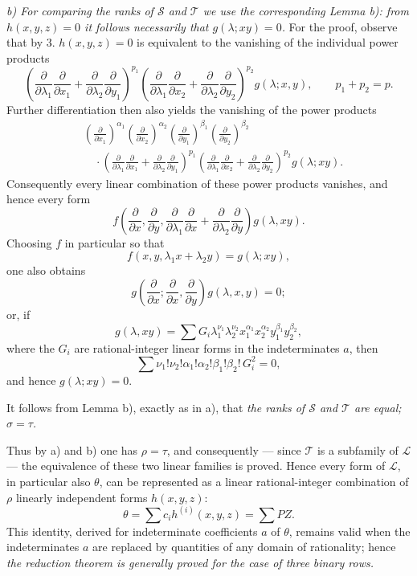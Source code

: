 \emph{b) For comparing the ranks of $\mathcal S$ and $\mathcal T$ we use the corresponding Lemma b): from $h(x,y,z)=0$ it follows necessarily that $g(\lambda;xy)=0$.} For the proof, observe that by 3. $h(x,y,z)=0$ is equivalent to the vanishing of the individual power products
\[
 \left(\frac{\partial}{\partial\lambda_1}\frac{\partial}{\partial x_1}
 +\frac{\partial}{\partial\lambda_2}\frac{\partial}{\partial y_1}\right)^{p_1}
 \left(\frac{\partial}{\partial\lambda_1}\frac{\partial}{\partial x_2}
 +\frac{\partial}{\partial\lambda_2}\frac{\partial}{\partial y_2}\right)^{p_2}g(\lambda;x,y),
 \qquad p_1+p_2=p.
\]
Further differentiation then also yields the vanishing of the power products
\[
\begin{aligned}
&\left(\frac{\partial}{\partial x_1}\right)^{\alpha_1}
 \left(\frac{\partial}{\partial x_2}\right)^{\alpha_2}
 \left(\frac{\partial}{\partial y_1}\right)^{\beta_1}
 \left(\frac{\partial}{\partial y_2}\right)^{\beta_2} \\
&\quad\cdot
 \left(\frac{\partial}{\partial\lambda_1}\frac{\partial}{\partial x_1}
 +\frac{\partial}{\partial\lambda_2}\frac{\partial}{\partial y_1}\right)^{p_1}
 \left(\frac{\partial}{\partial\lambda_1}\frac{\partial}{\partial x_2}
 +\frac{\partial}{\partial\lambda_2}\frac{\partial}{\partial y_2}\right)^{p_2}
 g(\lambda;xy).
\end{aligned}
\]
Consequently every linear combination of these power products vanishes, and hence every form
\[
  f\left(\frac{\partial}{\partial x},\frac{\partial}{\partial y},
  \frac{\partial}{\partial\lambda_1}\frac{\partial}{\partial x}
  +\frac{\partial}{\partial\lambda_2}\frac{\partial}{\partial y}\right)g(\lambda,xy).
\]
Choosing $f$ in particular so that
\[
  f(x,y,\lambda_1x+\lambda_2y)=g(\lambda;xy),
\]
one also obtains
\[
  g\left(\frac{\partial}{\partial x};
    \frac{\partial}{\partial x},
    \frac{\partial}{\partial y}\right)g(\lambda,x,y)=0;
\]
or, if
\[
  g(\lambda,xy)=\sum G_i\lambda_1^{\nu_1}\lambda_2^{\nu_2}
  x_1^{\alpha_1}x_2^{\alpha_2}y_1^{\beta_1}y_2^{\beta_2},
\]
where the $G_i$ are rational-integer linear forms in the indeterminates $a$, then
\[
  \sum \nu_1!\nu_2!\alpha_1!\alpha_2!\beta_1!\beta_2!\,G_i^2=0,
\]
and hence $g(\lambda;xy)=0$.

It follows from Lemma b), exactly as in a), that \emph{the ranks of $\mathcal S$ and $\mathcal T$ are equal; $\sigma=\tau$.}

Thus by a) and b) one has $\rho=\tau$, and consequently --- since $\mathcal T$ is a subfamily of $\mathcal L$ --- the equivalence of these two linear families is proved. Hence every form of $\mathcal L$, in particular also $\theta$, can be represented as a linear rational-integer combination of $\rho$ linearly independent forms $h(x,y,z)$:
\[
  \theta=\sum c_i h^{(i)}(x,y,z)=\sum PZ.
\]
This identity, derived for indeterminate coefficients $a$ of $\theta$, remains valid when the indeterminates $a$ are replaced by quantities of any domain of rationality; hence \emph{the reduction theorem is generally proved for the case of three binary rows.}

